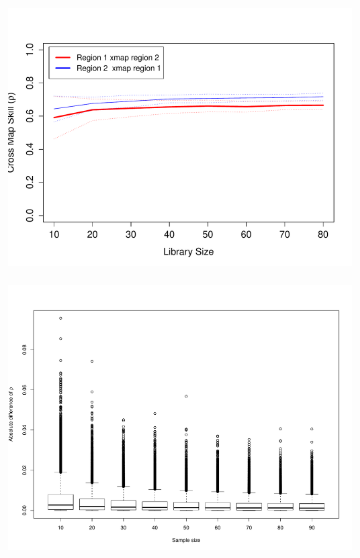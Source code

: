 \documentclass[journal,12pt,onecolumn,draftclsnofoot]{IEEEtran}  %
\begin{document}
\begin{figure}[H]  
  \centering
  \begin{subfigure}{0.48\textwidth}
    \centering
    \includegraphics[width=\linewidth]{figures/sample_pairwise_causality_measure.pdf}
    \caption{}
  \label{fig:sample_pair_causality_plot}
  \end{subfigure}
  \begin{subfigure}{0.48\textwidth}
    \centering
    \includegraphics[width=\linewidth]{figures/diff_in_sample_size.pdf}
    \caption{}
    \label{fig:sample_size_diff_box}
  \end{subfigure}

\end{figure}
\end{document}
